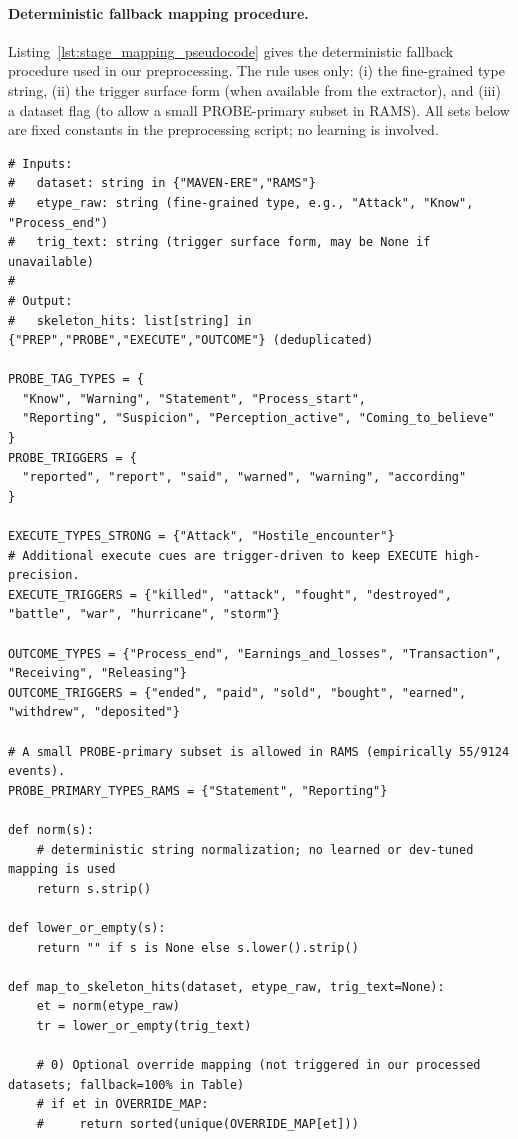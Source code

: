 \documentclass{article}
\begin{document}
\paragraph{Deterministic fallback mapping procedure.}
Listing~\ref{lst:stage_mapping_pseudocode} gives the deterministic fallback procedure used in our preprocessing.
The rule uses only: (i) the fine-grained type string, (ii) the trigger surface form (when available from the extractor), and (iii) a dataset flag (to allow a small PROBE-primary subset in RAMS).
All sets below are fixed constants in the preprocessing script; no learning is involved.

\begin{lstlisting}[caption={Deterministic fallback stage mapping procedure (pseudocode).},label={lst:stage_mapping_pseudocode}]
# Inputs:
#   dataset: string in {"MAVEN-ERE","RAMS"}
#   etype_raw: string (fine-grained type, e.g., "Attack", "Know", "Process_end")
#   trig_text: string (trigger surface form, may be None if unavailable)
#
# Output:
#   skeleton_hits: list[string] in {"PREP","PROBE","EXECUTE","OUTCOME"} (deduplicated)

PROBE_TAG_TYPES = {
  "Know", "Warning", "Statement", "Process_start",
  "Reporting", "Suspicion", "Perception_active", "Coming_to_believe"
}
PROBE_TRIGGERS = {
  "reported", "report", "said", "warned", "warning", "according"
}

EXECUTE_TYPES_STRONG = {"Attack", "Hostile_encounter"}
# Additional execute cues are trigger-driven to keep EXECUTE high-precision.
EXECUTE_TRIGGERS = {"killed", "attack", "fought", "destroyed", "battle", "war", "hurricane", "storm"}

OUTCOME_TYPES = {"Process_end", "Earnings_and_losses", "Transaction", "Receiving", "Releasing"}
OUTCOME_TRIGGERS = {"ended", "paid", "sold", "bought", "earned", "withdrew", "deposited"}

# A small PROBE-primary subset is allowed in RAMS (empirically 55/9124 events).
PROBE_PRIMARY_TYPES_RAMS = {"Statement", "Reporting"}

def norm(s):
    # deterministic string normalization; no learned or dev-tuned mapping is used
    return s.strip()

def lower_or_empty(s):
    return "" if s is None else s.lower().strip()

def map_to_skeleton_hits(dataset, etype_raw, trig_text=None):
    et = norm(etype_raw)
    tr = lower_or_empty(trig_text)

    # 0) Optional override mapping (not triggered in our processed datasets; fallback=100% in Table)
    # if et in OVERRIDE_MAP:
    #     return sorted(unique(OVERRIDE_MAP[et]))


\end{lstlisting}
\end{document}
